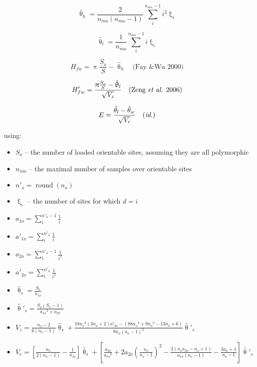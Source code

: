 \documentclass{scrartcl}
\begin{document}
\begin{displaymath}
    \hat{\uptheta}_h = \frac{2} {n_{mo}(n_{mo}-1)} \sum_i^{n_{mo}-1} i^2 \upxi_i
\end{displaymath}

\begin{displaymath}
    \hat{\uptheta}_l = \frac{1}{n_{mo}} \sum_i^{n_{mo}-1} i \upxi_i
\end{displaymath}

\begin{displaymath}
    H_{fw} = \uppi \frac{S_o}{S} - \hat{\uptheta}_h \quad \mbox{(Fay \& Wu 2000)}
\end{displaymath}

\begin{displaymath}
    H'_{fw} = \frac{\uppi \frac{S_o}{S} - \hat{\uptheta}_l} {\sqrt{V_z}} \quad \mbox{(Zeng \textit{et al.} 2006)}
\end{displaymath}

\begin{displaymath}
    E = \frac{\hat{\theta}_l - \hat{\theta}_w} {\sqrt{V_e}} \quad \mbox{(\textit{id.})}
\end{displaymath}

using:

\begin{itemize}
    \item[] $S_o$ -- the number of loaded orientable sites, assuming
        they are all polymorphic
    \item[] $n_{mo}$ -- the maximal number of samples over orientable
        sites
    \item[] $n'_o = \operatorname{round}(n_o)$
    \item[] $\upxi_i$ -- the number of sites for which $d = i$
    \item[] $a_{1o} = \sum_i^{n'_o-1} \frac{1}{i}$
    \item[] $a'_{1o} = \sum_i^{n'_o} \frac{1}{i}$
    \item[] $a_{2o} = \sum_i^{n'_o-1} \frac{1}{i^2}$
    \item[] $a'_{2o} = \sum_i^{n'_o} \frac{1}{i^2}$
    \item[] $\hat{\uptheta}_s = \frac{S_o}{a_{1o}}$
    \item[] $\hat{\uptheta}'_s = \frac{S_o(S_o-1)}{{a_{1o}}^2+a_{2o}}$
    \item[] $V_z = \frac{n_o - 2}{6(n_o-1)} \hat{\uptheta}_s + \frac{18{n_o}^2(3n_o+2)a'_{2o} - (88{n_o}^3+9{n_o}^2-13n_o+6)}{9n_o(n_o-1)^2} \hat{\uptheta}'_s$
    \item[] $V_e = \left[ \frac{n_o}{2(n_o-1)}-\frac{1}{a_{1o}} \right] \hat{\uptheta}_s + \left[ \frac{a_{2o}}{{a_{1o}}^2} + 2a_{2o}\left(\frac{n_o}{n_o-1}\right)^2 - \frac{2(n_oa_{2o}-n_o+1)}{a_{1o}(n_o-1)} - \frac{3n_o+1}{n_o-1} \right] \hat{\uptheta}'_s$
\end{itemize}
\end{document}
